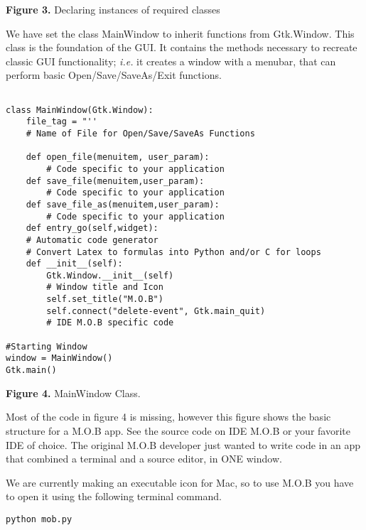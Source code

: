\documentclass[12pt]{article}
\begin{document}
\vspace{0.3cm}


\textbf{Figure 3.} Declaring instances of required classes


\vspace{0.4cm}

\indent We have set the class MainWindow to inherit functions from Gtk.Window.  This class is the foundation of the GUI.  It contains the methods necessary to recreate classic GUI functionality; \textit{i.e.} it creates a window with a menubar, that can perform basic Open/Save/SaveAs/Exit functions.  


{\footnotesize{
\begin{lstlisting}

class MainWindow(Gtk.Window):
    file_tag = "''		
    # Name of File for Open/Save/SaveAs Functions
   
    def open_file(menuitem, user_param):
    	# Code specific to your application
    def save_file(menuitem,user_param):   
    	# Code specific to your application
    def save_file_as(menuitem,user_param):
    	# Code specific to your application
    def entry_go(self,widget):
	# Automatic code generator
	# Convert Latex to formulas into Python and/or C for loops
    def __init__(self):
        Gtk.Window.__init__(self)
        # Window title and Icon
        self.set_title("M.O.B")
        self.connect("delete-event", Gtk.main_quit)
        # IDE M.O.B specific code
     
#Starting Window
window = MainWindow()
Gtk.main()

\end{lstlisting}

}}

\vspace{0.3cm}


\textbf{Figure 4.} MainWindow Class.  


\vspace{0.3cm}

\indent Most of the code in figure 4 is missing, however this figure shows the basic structure for a M.O.B app.  See the source code on IDE M.O.B or your favorite IDE of choice.  The original M.O.B developer just wanted to write code in an app that combined a terminal and a source editor, in ONE window. 

\indent We are currently making an executable icon for Mac, so to use M.O.B you have to open it using the following terminal
command.

{\footnotesize{
\begin{lstlisting} 
python mob.py
\end{lstlisting}
}}
\end{document}
